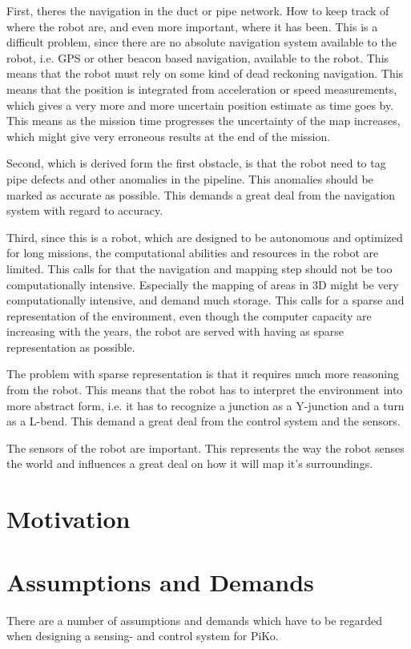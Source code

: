 First, theres the navigation in the duct or pipe network. How to keep track of where the robot
are, and even more important, where it has been. This is a difficult problem, since there
are no absolute navigation system available to the robot, i.e. GPS or other beacon based
navigation, available to the robot. This means that the robot must rely on some kind of
dead reckoning navigation. This means that the position is integrated from acceleration or
speed measurements, which gives a very more and more uncertain position estimate as time
goes by. This means as the mission time progresses the uncertainty of the map increases,
which might give very erroneous results at the end of the mission.

Second, which is derived form the first obstacle, is that the robot need to tag pipe
defects and other anomalies in the pipeline. This anomalies should be marked as accurate
as possible. This demands a great deal from the navigation system with regard to accuracy. 

Third, since this is a robot, which are designed to be autonomous and optimized for long
missions, the computational abilities and resources in the robot are limited. This calls
for that the navigation and mapping step should not be too computationally intensive.
Especially the mapping of areas in 3D might be very computationally intensive, and demand
much storage. This calls for a sparse and representation of the environment, even though
the computer capacity are increasing with the years, the robot are served with having as
sparse representation as possible. 

The problem with sparse representation is that it requires much more reasoning from the 
robot. This means that the robot has to interpret the environment into more abstract form,
i.e. it has to recognize a junction as a Y-junction and a turn as a L-bend. This demand a
great deal from the control system and the sensors. 

The sensors of the robot are important. This represents the way the robot senses the world
and influences a great deal on how it will map it's surroundings. 


\section{Motivation}


\section{Assumptions and Demands}
There are a number of assumptions and demands which have to be regarded when designing a
sensing- and control system for PiKo. 

